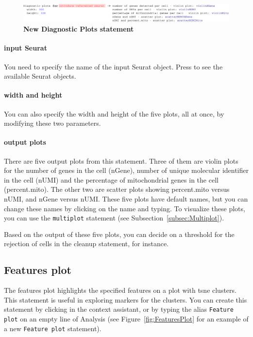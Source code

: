 \begin{figure}[h!tbp]
  \centering
  \includegraphics[width=\figWidthWide]{figures/DiagnosticPlots.pdf}
    \caption[New Diagnostic Plots statement.]{\textbf{New Diagnostic Plots statement}}
\label{fig:DiagnosticPlots}
\end{figure}

\paragraph{input Seurat} You need to specify the name of the input Seurat object. Press
\keys{\ctrl+\space} to see the available Seurat objects.

\paragraph{width and height} You can also specify the width and height of the five plots,
all at once, by modifying these two parameters.

\paragraph{output plots} There are five output plots from this statement. Three of them
are violin plots for the number of genes in the cell (nGene), number of unique molecular identifier
in the cell (nUMI) and the percentage of mitochondrial genes in the cell (percent.mito). The other two are
scatter plots showing percent.mito versus nUMI, and nGene versus nUMI. These five plots
have default names, but you can change these names by clicking on the name and typing. To
visualize these plots, you can use the \texttt{multiplot} statement (see Subsection~\ref{subsec:Multiplot}).

Based on the output of these five plots, you can decide on a threshold for the rejection
of cells in the cleanup statement, for instance.

\subsection{Features plot}
The features plot highlights the specified features on a plot with tsne clusters. This statement
is useful in exploring markers for the clusters.
You can create this statement by clicking
 in the context assistant, or by typing
the alias \texttt{Feature plot} on an empty line of Analysis (see Figure~\ref{fig:FeaturesPlot}
for an example of a new \texttt{Feature plot} statement).

